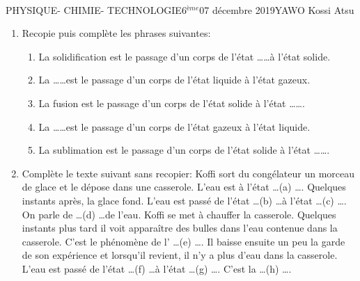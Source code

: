 \documentclass[12pt,a4paper]{book}
\newcommand{\prof}{YAWO Kossi Atsu}
\newcommand{\matiere}{\\PHYSIQUE- CHIMIE- TECHNOLOGIE}
\newcommand{\classe}{6$^{ème}$}
\begin{document}
\begin{td}{\matiere}{\classe}{07 décembre 2019}{\prof}
\begin{exo}
\begin{enumerate}
\item Recopie puis complète les phrases suivantes:
\begin{enumerate}
\item La solidification est le passage d'un corps de l'état \ldots \ldots à l'état solide.
\item La \ldots \ldots est le passage d'un corps de l'état liquide à l'état gazeux.
\item La fusion est le passage d'un corps de l'état solide à l'état \ldots \ldots.
\item La \ldots \ldots est le passage d'un corps de l'état gazeux à l'état liquide.
\item La sublimation est le passage d'un corps de l'état solide à l'état \ldots \ldots.
\end{enumerate}
\item Complète le texte suivant sans recopier:
Koffi sort du congélateur un morceau de glace et le dépose dans une casserole. L'eau est à l'état \ldots (a) \ldots . Quelques instants après, la glace fond. L'eau est passé de l'état \ldots (b) \ldots à l'état \ldots (c) \ldots . On parle de \ldots (d) \ldots de l'eau. Koffi se met à chauffer la casserole. Quelques instants plus tard il voit apparaître des bulles dans l'eau contenue dans la casserole. C'est le phénomène de l' \ldots (e) \ldots . Il baisse ensuite un peu la garde de son expérience et lorsqu'il revient, il n'y a plus d'eau dans la casserole. L'eau est passé de l'état \ldots (f) \ldots à l'état \ldots (g) \ldots. C'est la \ldots (h) \ldots.
\end{enumerate}
\end{exo}
\end{td}
\end{document}
